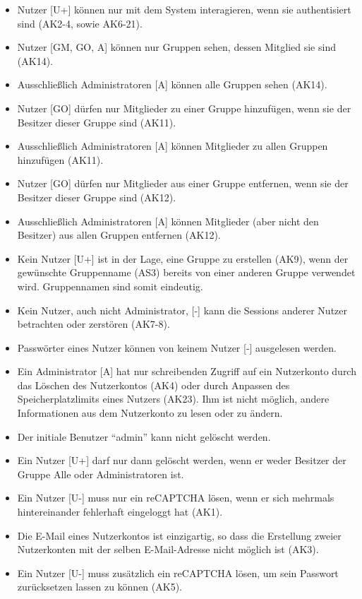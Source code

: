 \documentclass[fontsize=12pt,DIV=14,BCOR=10mm,a4paper,parskip=half-,headsepline,headinclude,english,ngerman,bibliography=totocnumbered]{scrreprt}
\begin{document}
\label{security-policies:new_policies}
\begin{itemize}
  \item Nutzer [U+] können nur mit dem System interagieren, wenn sie authentisiert sind (AK2-4, sowie AK6-21).
  \item Nutzer [GM, GO, A] können nur Gruppen sehen, dessen Mitglied sie sind (AK14).
  \item Ausschließlich Administratoren [A] können alle Gruppen sehen (AK14).
  \item Nutzer [GO] dürfen nur Mitglieder zu einer Gruppe hinzufügen, wenn sie der Besitzer dieser Gruppe sind (AK11).
  \item Ausschließlich Administratoren [A] können Mitglieder zu allen Gruppen hinzufügen (AK11).
  \item Nutzer [GO] dürfen nur Mitglieder aus einer Gruppe entfernen, wenn sie der Besitzer dieser Gruppe sind (AK12).
  \item Ausschließlich Administratoren [A] können Mitglieder (aber nicht den Besitzer) aus allen Gruppen entfernen (AK12).
  \item Kein Nutzer [U+] ist in der Lage, eine Gruppe zu erstellen (AK9), wenn der gewünschte Gruppenname (AS3) bereits von einer anderen Gruppe verwendet wird. Gruppennamen sind somit eindeutig.
  \item Kein Nutzer, auch nicht Administrator, [-] kann die Sessions anderer Nutzer betrachten oder zerstören (AK7-8).
  \item Passwörter eines Nutzer können von keinem Nutzer [-] ausgelesen werden.
  \item Ein Administrator [A] hat nur schreibenden Zugriff auf ein Nutzerkonto durch das Löschen des Nutzerkontos (AK4) oder durch Anpassen des Speicherplatzlimits eines Nutzers (AK23). Ihm ist nicht möglich, andere Informationen aus dem Nutzerkonto zu lesen oder zu ändern.
  \item Der initiale Benutzer \enquote{admin} kann nicht gelöscht werden.
  \item Ein Nutzer [U+] darf nur dann gelöscht werden, wenn er weder Besitzer der Gruppe Alle oder Administratoren ist.
  \item Ein Nutzer [U-] muss nur ein reCAPTCHA lösen, wenn er sich mehrmals hintereinander fehlerhaft eingeloggt hat (AK1).
  \item Die E-Mail eines Nutzerkontos ist einzigartig, so dass die Erstellung zweier Nutzerkonten mit der selben E-Mail-Adresse nicht möglich ist (AK3).
  \item Ein Nutzer [U-] muss zusätzlich ein reCAPTCHA lösen, um sein Passwort zurücksetzen lassen zu können (AK5).

\end{itemize}
\end{document}
